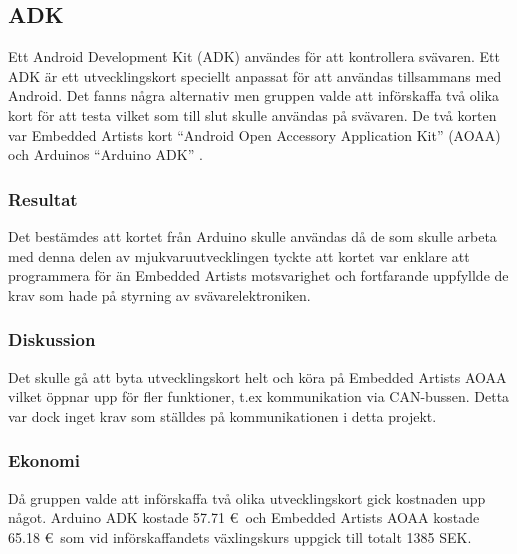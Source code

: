 \subsection{ADK}
Ett Android Development Kit (ADK) användes för att kontrollera svävaren. 
Ett ADK är ett utvecklingskort speciellt anpassat för att användas tillsammans med Android.
Det fanns några alternativ men gruppen valde att införskaffa två olika kort för att testa 
vilket som till slut skulle användas på svävaren. De två korten var Embedded Artists kort 
``Android Open Accessory Application Kit'' (AOAA) \cite{AOAA} och Arduinos ``Arduino ADK'' \cite{Arduino ADK}. 

\subsubsection{Resultat}
Det bestämdes att kortet från Arduino skulle användas då de som skulle
arbeta med denna delen av mjukvaruutvecklingen tyckte att kortet var enklare att
programmera för än Embedded Artists motsvarighet och fortfarande uppfyllde de
krav som hade på styrning av svävarelektroniken.

\subsubsection{Diskussion}
Det skulle gå att byta utvecklingskort helt och köra på Embedded Artists AOAA vilket öppnar upp för fler funktioner, 
t.ex kommunikation via CAN-bussen. Detta var dock inget krav som ställdes på
kommunikationen i detta projekt.

\subsubsection{Ekonomi}
Då gruppen valde att införskaffa två olika utvecklingskort gick kostnaden upp något. Arduino ADK kostade 57.71 \euro~och 
Embedded Artists AOAA kostade 65.18 \euro~som vid införskaffandets växlingskurs
uppgick till totalt 1385 SEK.
